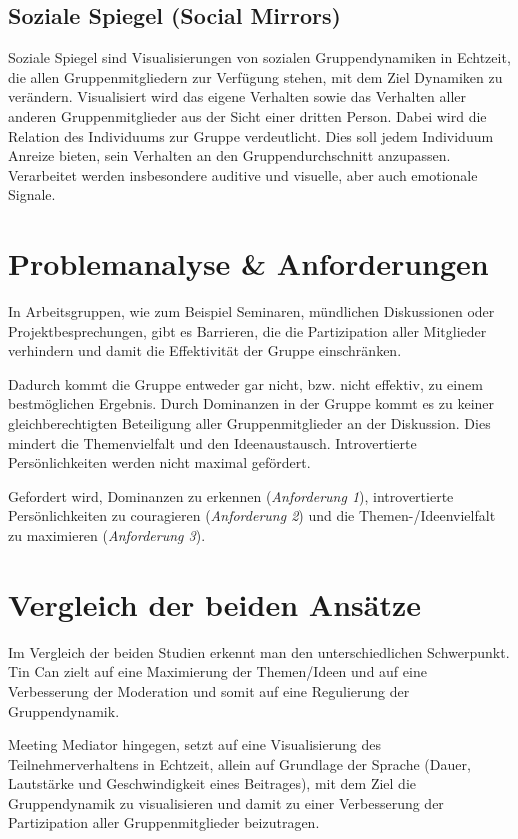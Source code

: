 \documentclass{seminarvorlage}
\begin{document}
\subsection{Soziale Spiegel (Social Mirrors)}
Soziale Spiegel \cite{BergKara2009-2} sind Visualisierungen von sozialen
Gruppendynamiken in Echtzeit, die allen Gruppenmitgliedern zur Verfügung stehen,
mit dem Ziel Dynamiken zu ver\-änd\-ern. Visualisiert wird das eigene Verhalten
sowie das Verhalten aller anderen Gruppenmitglieder aus der Sicht einer dritten
Person. Dabei wird die Relation des Individuums zur Gruppe verdeutlicht. Dies
soll jedem Individuum Anreize bieten, sein Verhalten an den Gruppendurchschnitt
anzupassen. Verarbeitet werden insbesondere auditive und visuelle, aber
auch emotionale Signale.

\section{Problemanalyse \& Anforderungen}
In Arbeitsgruppen, wie zum Beispiel Seminaren, münd\-lich\-en Diskussionen oder
Projektbesprechungen, gibt es Barrieren, die die Partizipation aller
Mitglieder verhindern und damit die Effektivität der Gruppe einschränken.

Dadurch kommt die Gruppe entweder gar nicht, bzw. nicht effektiv, zu einem
best\-mög\-lich\-en Ergebnis. Durch Dominanzen in der Gruppe kommt es zu
keiner gleichberechtigten Beteiligung aller Gruppenmitglieder an der Diskussion.
Dies mindert die Themenvielfalt und den Ideenaustausch. Introvertierte
Per\-sön\-lich\-keit\-en werden nicht maximal gefördert.

Gefordert wird, Dominanzen zu erkennen ({\em Anforderung 1}), introvertierte Per\-sön\-lich\-keit\-en
zu couragieren ({\em Anforderung 2}) und die Themen-/\-Ideen\-vielfalt zu maximieren ({\em Anforderung 3}).




\section{Vergleich der beiden Ansätze}
Im Vergleich der beiden Studien erkennt man den unterschiedlichen Schwerpunkt.
Tin Can \cite{HarGorSch2012} zielt auf eine Maximierung der Themen/Ideen und auf
eine Verbesserung der Moderation und somit auf eine Regulierung der Gruppendynamik.

Meeting Mediator \cite{KimChaHolPent2008} hingegen, setzt auf eine
Visualisierung des Teilnehmerverhaltens in Echtzeit, allein auf Grundlage der Sprache (Dauer,
Lautstärke und Geschwindigkeit eines Beitrages), mit dem Ziel die Gruppendynamik zu
visualisieren und damit zu einer Verbesserung der Partizipation aller
Gruppenmitglieder beizutragen.
\end{document}
